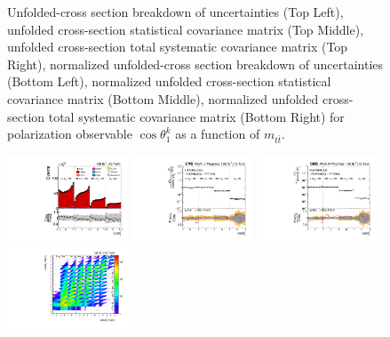\begin{figure}[htb]
\begin{center}
\caption{Unfolded-cross section breakdown of uncertainties (Top Left), unfolded cross-section statistical covariance matrix (Top Middle), unfolded cross-section total systematic covariance matrix (Top Right), normalized unfolded-cross section breakdown of uncertainties (Bottom Left), normalized unfolded cross-section statistical covariance matrix (Bottom Middle), normalized unfolded cross-section total systematic covariance matrix (Bottom Right) for polarization observable $\cos\theta_{1}^{k}$ as a function of $m_{t\bar{t}}$.}
\label{fig:b1k_mttbar_uncertainties}
\end{center}
\end{figure}
\clearpage
\begin{figure}[htb]
\begin{center}
 \includegraphics[width=0.32\textwidth]{fig_fullRun2UL/controlplots/combined/Hyp_LeptonBk_vs_TTBarMass.pdf}
 \includegraphics[width=0.32\textwidth]{fig_fullRun2UL/unfolding/combined/UnfoldedResults_b2k_mttbar.pdf}
 \includegraphics[width=0.32\textwidth]{fig_fullRun2UL/unfolding/combined/UnfoldedResultsNorm_b2k_mttbar.pdf} \\
 \includegraphics[width=0.32\textwidth]{fig_fullRun2UL/unfolding/combined/ResponseMatrix_b2k_mttbar.pdf}

\end{center}
\end{figure}
